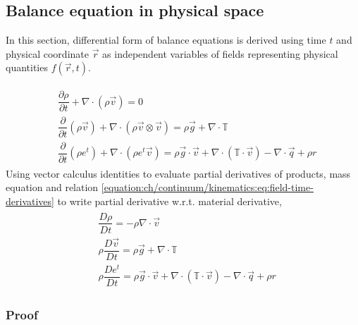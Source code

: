 \documentclass[letterpaper,10pt,english]{jupyterBook}
\begin{document}
\subsection{Balance equation in physical space}
\label{\detokenize{ch/continuum/balance-primary-differential:balance-equation-in-physical-space}}\label{\detokenize{ch/continuum/balance-primary-differential:continuum-governing-equations-primary-integral-physical}}
\sphinxAtStartPar
In this section, differential form of balance equations is derived using time \(t\) and physical coordinate \(\vec{r}\) as independent variables of fields representing physical quantities \(f(\vec{r},t)\).

\sphinxAtStartPar
{}
\begin{equation}\label{equation:ch/continuum/balance-primary-differential:eq:continuum:primary:differential:conservative}
\begin{split}\begin{aligned}
 & \dfrac{\partial \rho }{\partial t} + \nabla \cdot \left( \rho \vec{v} \right) = 0 \\
 & \dfrac{\partial }{\partial t} \left( \rho \vec{v} \right) +  \nabla \cdot \left( \rho \vec{v} \otimes \vec{v} \right) = \rho \vec{g} + \nabla \cdot \mathbb{T} \\
 & \dfrac{\partial}{\partial t}  \left( \rho e^t \right) + \nabla \cdot \left( \rho e^t \vec{v} \right) = \rho \vec{g} \cdot \vec{v} + \nabla \cdot \left( \mathbb{T} \cdot \vec{v} \right) - \nabla \cdot \vec{q} + \rho r
\end{aligned}\end{split}
\end{equation}
\sphinxAtStartPar
{} Using vector calculus identities to evaluate partial derivatives of products, mass equation and relation \eqref{equation:ch/continuum/kinematics:eq:field-time-derivatives} to write partial derivative w.r.t. material derivative,
\begin{equation*}
\begin{split}\begin{aligned}
 &      \dfrac{D \rho   }{D t} = - \rho \nabla \cdot \vec{v} \\
 & \rho \dfrac{D \vec{v}}{D t} = \rho \vec{g} + \nabla \cdot \mathbb{T} \\
 & \rho \dfrac{D e^t    }{D t} = \rho \vec{g} \cdot \vec{v} + \nabla \cdot \left( \mathbb{T} \cdot \vec{v} \right) - \nabla \cdot \vec{q} + \rho r
\end{aligned}\end{split}
\end{equation*}\subsubsection*{Proof}
\end{document}
